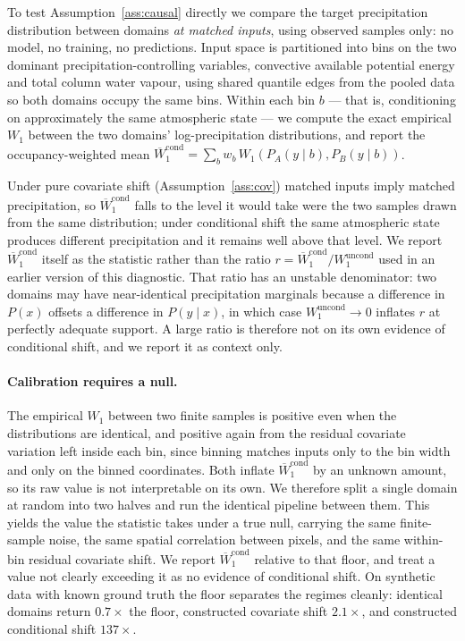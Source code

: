 \documentclass{article}
\begin{document}
To test Assumption~\ref{ass:causal} directly we compare the target
precipitation distribution between domains \emph{at matched inputs},
using observed samples only: no model, no training, no predictions.
Input space is partitioned into bins on the two dominant
precipitation-controlling variables, convective available potential
energy and total column water vapour, using shared quantile edges from
the pooled data so both domains occupy the same bins. Within each bin
$b$ --- that is, conditioning on approximately the same atmospheric
state --- we compute the exact empirical $W_1$ between the two domains'
log-precipitation distributions, and report the occupancy-weighted mean
$\overline{W}_1^{\text{cond}} = \sum_b w_b\, W_1(P_A(y\mid b),
P_B(y\mid b))$.

Under pure covariate shift (Assumption~\ref{ass:cov}) matched inputs
imply matched precipitation, so $\overline{W}_1^{\text{cond}}$ falls to
the level it would take were the two samples drawn from the same
distribution; under conditional shift the same atmospheric state
produces different precipitation and it remains well above that level.
We report $\overline{W}_1^{\text{cond}}$ itself as the statistic rather
than the ratio $r=\overline{W}_1^{\text{cond}}/W_1^{\text{uncond}}$
used in an earlier version of this diagnostic. That ratio has an
unstable denominator: two domains may have near-identical precipitation
marginals because a difference in $P(x)$ offsets a difference in
$P(y\mid x)$, in which case $W_1^{\text{uncond}}\to 0$ inflates $r$ at
perfectly adequate support. A large ratio is therefore not on its own
evidence of conditional shift, and we report it as context only.

\paragraph{Calibration requires a null.}
The empirical $W_1$ between two finite samples is positive even when
the distributions are identical, and positive again from the residual
covariate variation left inside each bin, since binning matches inputs
only to the bin width and only on the binned coordinates. Both inflate
$\overline{W}_1^{\text{cond}}$ by an unknown amount, so its raw value is
not interpretable on its own. We therefore split a single domain at
random into two halves and run the identical pipeline between them.
This yields the value the statistic takes under a true null, carrying
the same finite-sample noise, the same spatial correlation between
pixels, and the same within-bin residual covariate shift. We report
$\overline{W}_1^{\text{cond}}$ relative to that floor, and treat a
value not clearly exceeding it as no evidence of conditional shift. On
synthetic data with known ground truth the floor separates the regimes
cleanly: identical domains return $0.7\times$ the floor, constructed
covariate shift $2.1\times$, and constructed conditional shift
$137\times$.
\end{document}
